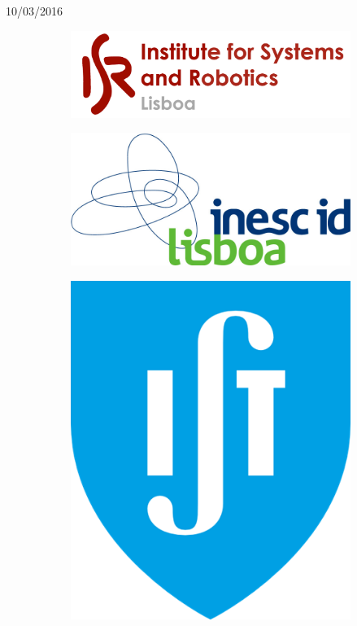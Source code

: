 \begin{titlepage}


{\large 10/03/2016}\\[1cm] %




\begin{figure}
\centering
\begin{subfigure}{.5\textwidth}
  \centering
  \includegraphics[width=.5\linewidth]{isr-logo.png}
\end{subfigure}%
\begin{subfigure}{.5\textwidth}
  \centering
  \includegraphics[width=.5\linewidth]{inesc-id-logo.png}
\end{subfigure}
\begin{subfigure}{.5\textwidth}
  \centering
  \includegraphics[width=.25\linewidth]{ist-logo.png}
\end{subfigure}
\end{figure}
 

\end{titlepage}
